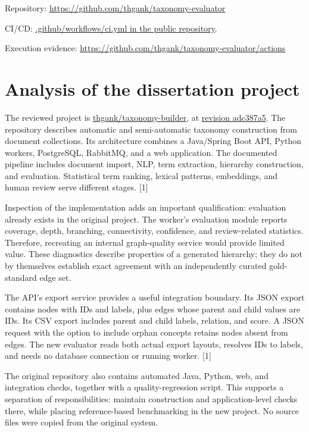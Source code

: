 \documentclass[12pt,a4paper]{article}
\newcommand{\source}[1]{\textnormal{[#1]}}
\newcommand{\link}[2]{\href{#1}{#2}}
\begin{document}
Repository: \url{https://github.com/thgank/taxonomy-evaluator}\par
CI/CD: \link{https://github.com/thgank/taxonomy-evaluator/blob/main/.github/workflows/ci.yml}{.github/workflows/ci.yml in the public repository}.\par
Execution evidence: \url{https://github.com/thgank/taxonomy-evaluator/actions}

\clearpage
\section{Analysis of the dissertation project}
The reviewed project is \link{https://github.com/thgank/taxonomy-builder}{thgank/taxonomy-builder}, at \link{https://github.com/thgank/taxonomy-builder/tree/adc387a5d227bf3ebb9c79a3fa0429415fe8b9cc}{revision adc387a5}. The repository describes automatic and semi-automatic taxonomy construction from document collections. Its architecture combines a Java/Spring Boot API, Python workers, PostgreSQL, RabbitMQ, and a web application. The documented pipeline includes document import, NLP, term extraction, hierarchy construction, and evaluation. Statistical term ranking, lexical patterns, embeddings, and human review serve different stages. \source{1}

Inspection of the implementation adds an important qualification: evaluation already exists in the original project. The worker's evaluation module reports coverage, depth, branching, connectivity, confidence, and review-related statistics. Therefore, recreating an internal graph-quality service would provide limited value. These diagnostics describe properties of a generated hierarchy; they do not by themselves establish exact agreement with an independently curated gold-standard edge set.

The API's export service provides a useful integration boundary. Its JSON export contains nodes with IDs and labels, plus edges whose parent and child values are IDs. Its CSV export includes parent and child labels, relation, and score. A JSON request with the option to include orphan concepts retains nodes absent from edges. The new evaluator reads both actual export layouts, resolves IDs to labels, and needs no database connection or running worker. \source{1}

The original repository also contains automated Java, Python, web, and integration checks, together with a quality-regression script. This supports a separation of responsibilities: maintain construction and application-level checks there, while placing reference-based benchmarking in the new project. No source files were copied from the original system.
\end{document}
